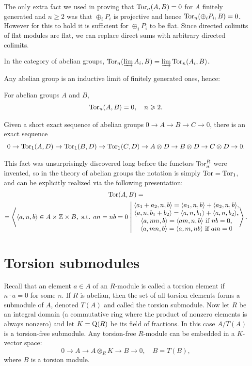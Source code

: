 The only extra fact we used in proving that $\operatorname{Tor}_n(A,B)=0$ for $A$ finitely generated and $n\geq 2$ was that $\oplus_i P_i$ is projective and hence $\operatorname{Tor}_n(\oplus_i P_i,B)=0$. However for this to hold it is sufficient for $\oplus_i P_i$ to be flat. Since directed colimits of flat modules are flat, we can replace direct sums with arbitrary directed colimits.

\begin{thm} In the category of abelian groups,
    $\operatorname{Tor}_n(\varinjlim A_i,B)=\varinjlim \operatorname{Tor}_n(A_i,B)$.
\end{thm}
Any abelian group is an inductive limit of finitely generated ones, hence:
\begin{cor}
    For abelian groups $A$ and $B$,
    \[\operatorname{Tor}_n(A,B)=0,\quad n\geqslant 2.\]
\end{cor}
\begin{cor}
    Given a short exact sequence of abelian groups $0\to A\to B\to C\to 0$, there is an exact sequence
    \[0\to\operatorname{Tor}_1(A,D)\to \operatorname{Tor}_1(B,D)\to \operatorname{Tor}_1(C,D)\to A\otimes D\to B\otimes D\to C\otimes D\to 0.\]
\end{cor}

This fact was unsurprisingly discovered long before the functors $\operatorname{Tor}_n^R$ were invented, so in the theory of abelian groups the notation is simply $\operatorname{Tor}=\operatorname{Tor}_1$, and can be explicitly realized via the following presentation:
\begin{multline}
    \Tor(A,B)=\\
    =\left\langle \langle a,n,b\rangle\in A\times \bbZ\times B,\text{ s.t. } an=nb=0 
    \middle|
    \begin{matrix}
    \langle a_1+a_2,n,b\rangle= \langle a_1,n,b\rangle+\langle a_2,n,b\rangle,\\
    \langle a,n,b_1+b_2\rangle=\langle a,n,b_1\rangle+\langle a,n,b_2\rangle,\\
    \langle a,mn,b\rangle=\langle am,n,b\rangle \text{ if }nb=0,\\
    \langle a,mn,b\rangle=\langle a,m,nb\rangle \text{ if }am=0
    \end{matrix}
    \right\rangle.
\end{multline}




\section{Torsion submodules}

Recall that an element $a\in A$ of an $R$-module is called a torsion element if $n\cdot a=0$ for some $n$. If $R$ is abelian, then the set of all torsion elements forms a submodule of $A$, denoted $T(A)$ and called the torsion submodule. Now let $R$ be an integral domain (a commutative ring where the product of nonzero elements is always nonzero) and let $K=\mathrm{Q}(R)$ be its field of fractions. In this case $A\slash T(A)$ is a torsion-free submodule. Any torsion-free $R$-module can be embedded in a $K$-vector space:
\[0\to A\to A\otimes_R K\to B\to 0,\quad B=T(B),\]
where $B$ is a torsion module.

